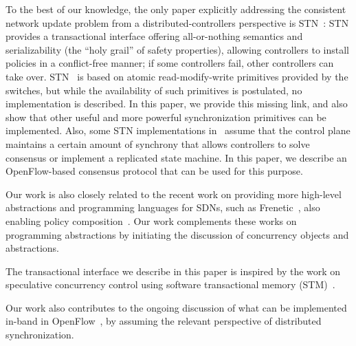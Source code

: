 \documentclass[conference]{sigcomm-alternate}
\begin{document}
To the best of our knowledge, the only paper explicitly addressing the consistent
network update problem from a distributed-controllers perspective is STN~\cite{stn}:
STN provides a transactional interface offering all-or-nothing semantics and serializability
(the ``holy grail'' of safety properties), allowing
controllers to install policies in a conflict-free manner; if some controllers fail,
other controllers can take over. STN~\cite{stn} is based on
atomic read-modify-write primitives provided by the switches, but
while the availability of such primitives is postulated, no implementation is
described. In this paper, we provide this missing link, and also show that other useful and
more powerful synchronization primitives can be implemented.
Also, some STN implementations in~\cite{stn} assume that the control
plane maintains a certain amount of synchrony that allows controllers
to solve consensus or implement a replicated state machine.
In this paper, we describe an OpenFlow-based consensus protocol that
can be used for this purpose.

Our work is also closely related to the recent work on providing more high-level
abstractions and programming languages for SDNs, such as Frenetic~\cite{frenetic},
also enabling policy composition~\cite{pyretic}. Our work complements these works
on programming abstractions
by initiating the discussion of concurrency objects and abstractions.

The transactional interface we describe in this paper is inspired by the
work on speculative concurrency control using software transactional memory
(STM)~\cite{stm-st95,tm-book}.

Our work also contributes to the ongoing discussion of what can be implemented
in-band in OpenFlow~\cite{compute,reclaim}, by assuming the relevant perspective of distributed
synchronization.
\end{document}
